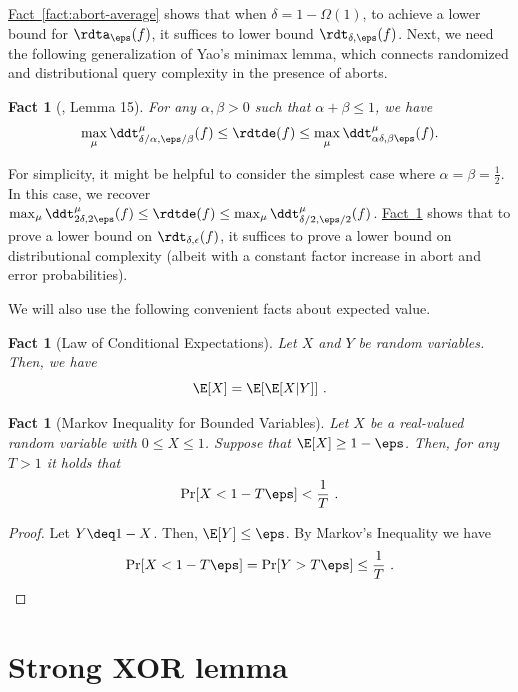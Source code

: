 \documentclass[11pt]{article}
\numberwithin{equation}{section}
\newtheorem{fact}[theorem]{Fact}
\theoremstyle{definition}
\theoremstyle{plain}
\newcommand{\expref}[2]{\hyperref[#2]{#1~\ref{#2}}}
\begin{document}
\expref{Fact}{fact:abort-average} shows that when $\delta = 1-\Omega(1)$, to
achieve a lower bound for $\rdta_\eps(f)$, it suffices to lower bound
$\rdt_{\delta,\eps}(f)$.
Next, we need the following generalization of Yao's minimax lemma,
which connects randomized and distributional query complexity in the
presence of aborts.
\begin{fact}[\cite{BlaisB19}, Lemma 15]
\label{fact:yao-abort}
For any $\alpha,\beta>0$ such that $\alpha+\beta \leq 1$, we have
\[
\max_\mu \ddt_{\delta/\alpha, \eps/\beta}^\mu(f) \leq \rdtde(f)
    \leq \max_{\mu} \ddt_{\alpha\delta, \beta\eps}^\mu(f).
\]
\end{fact}
For simplicity, it might be helpful to consider the simplest case
where $\alpha = \beta = \frac{1}{2}$.  In this case, we recover
$\max_\mu \ddt_{2\delta, 2\eps}^\mu(f) \leq \rdtde(f) \leq \max_{\mu}
\ddt_{\delta/2, \eps/2}^\mu(f)$.  \expref{Fact}{fact:yao-abort} shows that
to prove a lower bound on $\rdt_{\delta,\epsilon}(f)$, it suffices to
prove a lower bound on distributional complexity (albeit with a
constant factor increase in abort and error probabilities).

%
We will also use the following convenient facts about expected value.
\begin{fact}[Law of Conditional Expectations]\label{fact:prob-ex2}
  Let $X$ and $Y$ be random variables.  Then, we have $$\E[X] = \E[\E[X|Y]]\ .$$
\end{fact}

%
%
%
%
%
%
%
%
%
%
%
%
%
%
%
%
%
%
%
%

\begin{fact}[Markov Inequality for Bounded Variables]\label{fact:bounded-markov}
  Let $X$ be a real-valued random variable with $0\leq X \leq 1$.
  Suppose that $\E[X] \geq 1-\eps$.  Then, for any $T>1$ it holds that
  $$\Pr[X<1-T\eps] < \frac{1}{T}\ .$$
\end{fact}
\begin{proof}
  Let $Y \deq 1-X$.  Then, $\E[Y] \leq \eps$.  By Markov's Inequality
  we have
\begin{equation*}
  \Pr[X<1-T\eps] = \Pr[Y > T\eps] \leq \frac{1}{T}\ .\qedhere
\end{equation*}
\end{proof}

%
\section{Strong XOR lemma}\label{sec:main}   %
\end{document}
